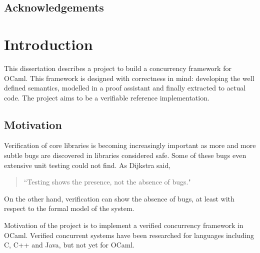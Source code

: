 \documentclass[12pt,twoside,notitlepage]{report}
\theoremstyle{plain}%
\theoremstyle{definition}
\theoremstyle{remark}
\begin{document}
\medskip
{}

\cleardoublepage


\tableofcontents

\listoffigures

\lstlistoflistings

\listoftheorems[numwidth=3em]



\newpage
\section*{Acknowledgements}


\cleardoublepage        %

\setcounter{page}{1}
\pagestyle{headings}
\chapter{Introduction}

This dissertation describes a project to build a concurrency framework for OCaml. This framework is designed with correctness in mind: developing the well defined semantics, modelled in a proof assistant and finally extracted to actual code. The project aims to be a verifiable reference implementation. 

\section{Motivation}
Verification of core libraries is becoming increasingly important as more and more subtle bugs are discovered in libraries considered safe. Some of these bugs even extensive unit testing could not find. As Dijkstra said, \begin{quote}``Testing shows the presence, not the absence of bugs."\end{quote} On the other hand, verification can show the absence of bugs, at least with respect to the formal model of the system.

Motivation of the project is to implement a verified concurrency framework in OCaml. Verified concurrent systems have been researched for languages including C\cite{sevvcik2011relaxed}, C++ and Java\cite{lochbihler2012machine}, but not yet for OCaml. 
\end{document}
